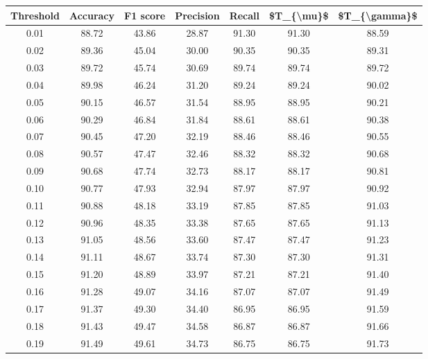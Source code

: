 \begin{tabular}{|c|c|c|c|c|c|c|}
\hline
 Threshold &  Accuracy &  F1 score &  Precision &  Recall &  \$T\_\{\textbackslash mu\}\$ &  \$T\_\{\textbackslash gamma\}\$ \\
\hline
      0.01 &     88.72 &     43.86 &      28.87 &   91.30 &      91.30 &         88.59 \\
      0.02 &     89.36 &     45.04 &      30.00 &   90.35 &      90.35 &         89.31 \\
      0.03 &     89.72 &     45.74 &      30.69 &   89.74 &      89.74 &         89.72 \\
      0.04 &     89.98 &     46.24 &      31.20 &   89.24 &      89.24 &         90.02 \\
      0.05 &     90.15 &     46.57 &      31.54 &   88.95 &      88.95 &         90.21 \\
      0.06 &     90.29 &     46.84 &      31.84 &   88.61 &      88.61 &         90.38 \\
      0.07 &     90.45 &     47.20 &      32.19 &   88.46 &      88.46 &         90.55 \\
      0.08 &     90.57 &     47.47 &      32.46 &   88.32 &      88.32 &         90.68 \\
      0.09 &     90.68 &     47.74 &      32.73 &   88.17 &      88.17 &         90.81 \\
      0.10 &     90.77 &     47.93 &      32.94 &   87.97 &      87.97 &         90.92 \\
      0.11 &     90.88 &     48.18 &      33.19 &   87.85 &      87.85 &         91.03 \\
      0.12 &     90.96 &     48.35 &      33.38 &   87.65 &      87.65 &         91.13 \\
      0.13 &     91.05 &     48.56 &      33.60 &   87.47 &      87.47 &         91.23 \\
      0.14 &     91.11 &     48.67 &      33.74 &   87.30 &      87.30 &         91.31 \\
      0.15 &     91.20 &     48.89 &      33.97 &   87.21 &      87.21 &         91.40 \\
      0.16 &     91.28 &     49.07 &      34.16 &   87.07 &      87.07 &         91.49 \\
      0.17 &     91.37 &     49.30 &      34.40 &   86.95 &      86.95 &         91.59 \\
      0.18 &     91.43 &     49.47 &      34.58 &   86.87 &      86.87 &         91.66 \\
      0.19 &     91.49 &     49.61 &      34.73 &   86.75 &      86.75 &         91.73 \\

\end{tabular}
